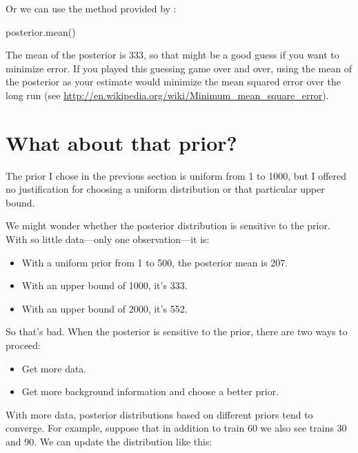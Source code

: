 \documentclass[12pt]{book}
\theoremstyle{exercise}
\begin{document}
Or we can use the method provided by :

\begin{code}
posterior.mean()
\end{code}

The mean of the posterior is 333, so that might be a good guess if you want to minimize error.  
If you played this guessing game over and over, using the mean of the posterior as your estimate would minimize the mean squared error over the long run (see \url{http://en.wikipedia.org/wiki/Minimum_mean_square_error}).



\section{What about that prior?}

The prior I chose in the previous section is uniform from 1 to 1000, but I offered no justification for choosing a uniform distribution or that particular upper bound.


We might wonder whether the posterior distribution is sensitive to the prior.  
With so little data---only one observation---it is:

\begin{itemize}

\item With a uniform prior from 1 to 500, the posterior mean is 207.

\item With an upper bound of 1000, it's 333.

\item With an upper bound of 2000, it's 552.

\end{itemize}

So that's bad.  
When the posterior is sensitive to the prior, there are two ways to proceed:

\begin{itemize}

\item Get more data.

\item Get more background information and choose a better prior.

\end{itemize}

With more data, posterior distributions based on different
priors tend to converge.  
For example, suppose that in addition
to train 60 we also see trains 30 and 90.  
We can update the distribution like this:
\end{document}
